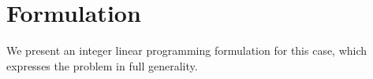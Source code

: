 \section{Formulation}
We present an integer linear programming formulation for this case, which expresses the problem in full generality.




